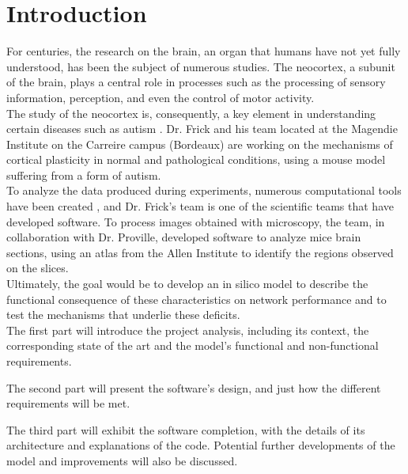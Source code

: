 \documentclass[a4paper,12pt]{report}
\begin{document}
\setcounter{tocdepth}{1}
\setcounter{secnumdepth}{3}
\renewcommand{\contentsname}{Contents} 
\tableofcontents
\thispagestyle{empty}

\chapter*{Introduction}

\indent For centuries, the research on the brain, an organ that humans have not yet fully understood, has been the subject of numerous studies. The neocortex, a subunit of the brain, plays a central role in processes such as the processing of sensory information, perception, and even the control of motor activity.\\

The study of the neocortex is, consequently, a key element in understanding certain diseases such as autism \cite{kaner}. Dr. Frick and his team located at the Magendie Institute on the Carreire campus (Bordeaux) are working on the mechanisms of cortical plasticity in normal and pathological conditions, using a mouse model suffering from a form of autism.\\

To analyze the data produced during experiments, numerous computational tools have been created \cite{australianimaging} \cite{vmb}, and Dr. Frick's team is one of the scientific teams that have developed software. To process images obtained with microscopy, the team, in collaboration with Dr. Proville, developed software to analyze mice brain sections, using an atlas from the Allen Institute to identify the regions observed on the slices. \\

Ultimately, the goal would be to develop an in silico model to describe the functional consequence of these characteristics on network performance and to test the mechanisms that underlie these deficits.\\

The first part will introduce the project analysis, including its context, the corresponding state of the art and the model’s functional and non-functional requirements.

The second part will present the software’s design, and just how the different requirements will be met.

The third part will exhibit the software completion, with the details of its architecture and explanations of the code. Potential further developments of the model and improvements will also be discussed.
\end{document}
